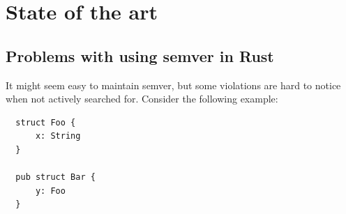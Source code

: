 \documentclass[licencjacka,en]{pracamgr}
\begin{document}




\chapter{State of the art}\label{r:chapter_state_of_the_art}

\section{Problems with using semver in Rust}\label{r:section_rust_semver_problems}

It might seem easy to maintain semver, but some violations are hard to notice
when not actively searched for. Consider the following example:
\vspace{-3pt}
\begin{verbatim}
  struct Foo {
      x: String
  }

  pub struct Bar {
      y: Foo
  }
\end{verbatim}
\vspace{-5pt}
\end{document}
